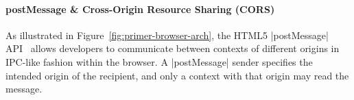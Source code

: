 

\paragraph{postMessage \& Cross-Origin Resource Sharing (CORS)}

As illustrated in Figure~\ref{fig:primer-browser-arch}, the HTML5
\js|postMessage| API~\cite{webmessaging} allows developers to
communicate between contexts of different origins in IPC-like fashion
within the browser. A \js|postMessage| sender specifies the intended
origin of the recipient, and only a context with that origin may read
the message.
%
%

